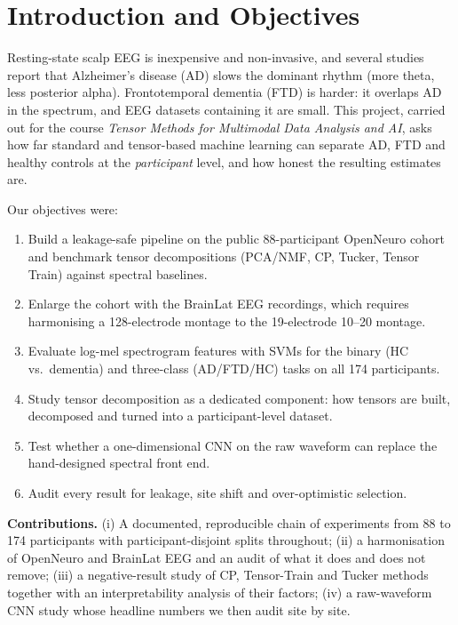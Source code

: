 \documentclass[10pt,twocolumn,a4paper]{article}
\begin{document}
\section{Introduction and Objectives}
\label{sec:intro}
Resting-state scalp EEG is inexpensive and non-invasive, and several studies report that Alzheimer's disease (AD) slows the dominant rhythm (more theta, less posterior alpha). Frontotemporal dementia (FTD) is harder: it overlaps AD in the spectrum, and EEG datasets containing it are small. This project, carried out for the course \emph{Tensor Methods for Multimodal Data Analysis and AI}, asks how far standard and tensor-based machine learning can separate AD, FTD and healthy controls at the \emph{participant} level, and how honest the resulting estimates are.

Our objectives were:
\begin{enumerate}[label=\textbf{O\arabic*.}]
\item Build a leakage-safe pipeline on the public 88-participant OpenNeuro cohort and benchmark tensor decompositions (PCA/NMF, CP, Tucker, Tensor Train) against spectral baselines.
\item Enlarge the cohort with the BrainLat EEG recordings, which requires harmonising a 128-electrode montage to the 19-electrode 10--20 montage.
\item Evaluate log-mel spectrogram features with SVMs for the binary (HC vs.\ dementia) and three-class (AD/FTD/HC) tasks on all 174 participants.
\item Study tensor decomposition as a dedicated component: how tensors are built, decomposed and turned into a participant-level dataset.
\item Test whether a one-dimensional CNN on the raw waveform can replace the hand-designed spectral front end.
\item Audit every result for leakage, site shift and over-optimistic selection.
\end{enumerate}

\noindent\textbf{Contributions.} (i) A documented, reproducible chain of experiments from 88 to 174 participants with participant-disjoint splits throughout; (ii) a harmonisation of OpenNeuro and BrainLat EEG and an audit of what it does and does not remove; (iii) a negative-result study of CP, Tensor-Train and Tucker methods together with an interpretability analysis of their factors; (iv) a raw-waveform CNN study whose headline numbers we then audit site by site.
\end{document}
